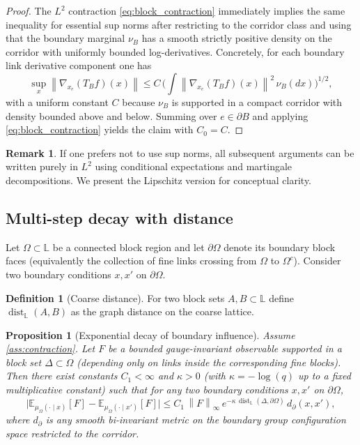 \documentclass[11pt]{article}
\newtheorem{proposition}[theorem]{Proposition}
\theoremstyle{definition}
\newtheorem{definition}[theorem]{Definition}
\newtheorem{remark}[theorem]{Remark}
\newcommand{\E}{\mathbb{E}}
\newcommand{\1}{\mathbf{1}}
\newcommand{\dist}{\operatorname{dist}}
\newcommand{\norm}[1]{\left\lVert#1\right\rVert}
\begin{document}
\begin{proof}
The $L^2$ contraction \eqref{eq:block_contraction} immediately implies the same inequality for essential sup norms after restricting to the corridor class and using that the boundary marginal $\nu_B$ has a smooth strictly positive density on the corridor with uniformly bounded log-derivatives. Concretely, for each boundary link derivative component one has
\[
\sup_x\norm{\nabla_{x_e}(T_B f)(x)}
\le C\,\Big(\int \norm{\nabla_{x_e}(T_B f)(x)}^2\,\nu_B(dx)\Big)^{1/2},
\]
with a uniform constant $C$ because $\nu_B$ is supported in a compact corridor with density bounded above and below. Summing over $e\in\partial B$ and applying \eqref{eq:block_contraction} yields the claim with $C_0=C$.
\end{proof}

\begin{remark}
If one prefers not to use sup norms, all subsequent arguments can be written purely in $L^2$ using conditional expectations and martingale decompositions. We present the Lipschitz version for conceptual clarity.
\end{remark}

\subsection{Multi-step decay with distance}
Let $\Omega\subset\mathbb{L}$ be a connected block region and let $\partial\Omega$ denote its boundary block faces (equivalently the collection of fine links crossing from $\Omega$ to $\Omega^c$). Consider two boundary conditions $x, x'$ on $\partial\Omega$.

\begin{definition}[Coarse distance]
For two block sets $A,B\subset\mathbb{L}$ define $\dist_{\mathbb{L}}(A,B)$ as the graph distance on the coarse lattice.
\end{definition}

\begin{proposition}[Exponential decay of boundary influence]\label{prop:influence}
Assume \ref{ass:contraction}. Let $F$ be a bounded gauge-invariant observable supported in a block set $\Delta\subset\Omega$ (depending only on links inside the corresponding fine blocks). Then there exist constants $C_1<\infty$ and $\kappa>0$ (with $\kappa=-\log(q)$ up to a fixed multiplicative constant) such that for any two boundary conditions $x,x'$ on $\partial\Omega$,
\begin{equation}\label{eq:influence_decay}
\big|\E_{\mu_{\Omega}(\cdot\mid x)}[F] - \E_{\mu_{\Omega}(\cdot\mid x')}[F]\big|
\le C_1\, \norm{F}_\infty\, e^{-\kappa\,\dist_{\mathbb{L}}(\Delta,\partial\Omega)}\, d_\partial(x,x'),
\end{equation}
where $d_\partial$ is any smooth bi-invariant metric on the boundary group configuration space restricted to the corridor.
\end{proposition}
\end{document}
